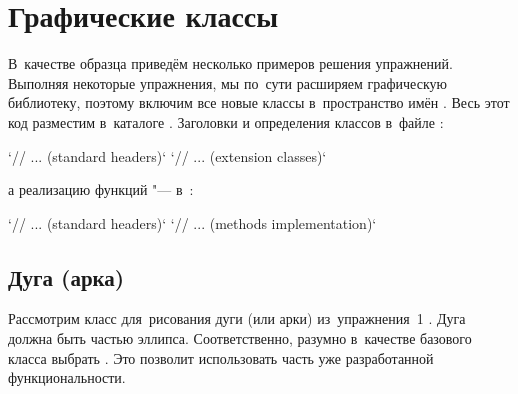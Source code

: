 
\chapter{Графические классы}
В~качестве образца приведём несколько примеров решения упражнений. Выполняя некоторые упражнения, мы по~сути расширяем графическую библиотеку, поэтому включим все новые классы в~пространство имён . Весь этот код разместим в~каталоге . Заголовки и определения классов в~файле :

\cpp`// ... (standard headers)`
\cpp`// ... (extension classes)`

\noindent а реализацию функций "--- в~:

\cpp`// ... (standard headers)`
\cpp`// ... (methods implementation)`



\section{Дуга (арка)}
Рассмотрим класс  для~рисования дуги (или арки) из~упражнения~1 . Дуга должна быть частью эллипса. Соответственно, разумно в~качестве базового класса выбрать . Это позволит использовать часть уже разработанной функциональности.

